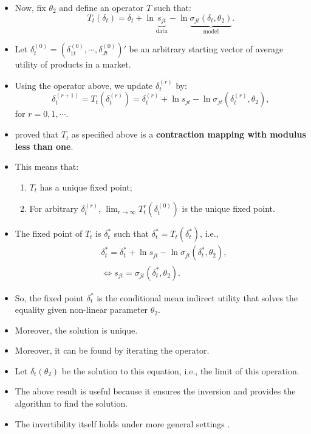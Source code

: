 \documentclass[
]{book}
\providecommand{\tightlist}{%
  \setlength{\itemsep}{0pt}\setlength{\parskip}{0pt}}
\begin{document}
\begin{itemize}
\tightlist
\item
  Now, fix \(\theta_2\) and define an operator \(T\) such that:
  \begin{equation}
  T_t(\delta_t) = \delta_t + \ln \underbrace{s_{jt}}_{\text{data}} - \ln \underbrace{\sigma_{jt}(\delta_t, \theta_2)}_{\text{model}}.
  \end{equation}
\item
  Let \(\delta_t^{(0)} = (\delta_{1t}^{(0)}, \cdots, \delta_{Jt}^{(0)})'\) be an arbitrary starting vector of average utility of products in a market.
\item
  Using the operator above, we update \(\delta_{t}^{(r)}\) by:
  \begin{equation}
  \delta_{t}^{(r + 1)} = T_t(\delta_{t}^{(r)}) = \delta_t^{(r)} + \ln s_{jt} - \ln \sigma_{jt}(\delta_t^{(r)}, \theta_2),
  \end{equation}
  for \(r = 0, 1, \cdots\).
\item
  \citet{Berry1995a} proved that \(T_t\) as specified above is a \textbf{contraction mapping with modulus less than one}.
\item
  This means that:

  \begin{enumerate}
  \def\labelenumi{\arabic{enumi}.}
  \tightlist
  \item
    \(T_t\) has a unique fixed point;
  \item
    For arbitrary \(\delta_t^{(r)}\), \(\lim_{r \to \infty} T_t^r(\delta_t^{(0)})\) is the unique fixed point.
  \end{enumerate}
\item
  The fixed point of \(T_t\) is \(\delta_t^*\) such that \(\delta_t^* = T_t(\delta_t^*)\), i.e.,
  \begin{equation}
  \begin{split}
  &\delta_t^* = \delta_t^* + \ln s_{jt} - \ln \sigma_{jt}(\delta_t^*, \theta_2),\\
  &\Leftrightarrow s_{jt} = \sigma_{jt}(\delta_t^*, \theta_2).
  \end{split}
  \end{equation}
\item
  So, the fixed point \(\delta_t^*\) is the conditional mean indirect utility that solves the equality given non-linear parameter \(\theta_2\).
\item
  Moreover, the solution is unique.
\item
  Moreover, it can be found by iterating the operator.
\item
  Let \(\delta_t(\theta_2)\) be the solution to this equation, i.e., the limit of this operation.
\item
  The above result is useful because it ensures the inversion and provides the algorithm to find the solution.
\item
  The invertibility itself holds under more general settings \citep{Berry2013}.
\end{itemize}
\end{document}
